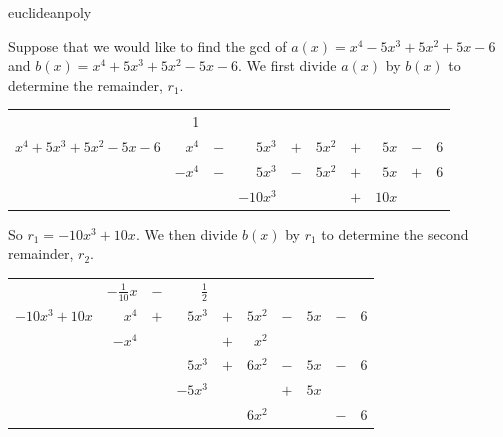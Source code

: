 \begin{example}{euclideanpoly} 

Suppose that we would like to find the gcd of $a(x) = x^4 - 5x^3 + 5x^2 +5x - 6$ and $b(x) = x^4 + 5x^3 + 5x^2 - 5x -6$.  We first divide $a(x)$ by $b(x)$ to determine the remainder, $r_1$.

\begin{center}
\begin{tabular}{rrcrcrcrcr}
        &  1         &        &                 &           &             &         &         &        &   \\ \cline{2-10}
 \multicolumn{1}{r|}{$x^4 + 5x^3 + 5x^2 - 5x -6$}
        &  $x^4$  &  $-$  &    $5x^3$   &  $+$   & $5x^2$  &  $+$  &  $5x$ & $-$  & 6 \\
        &  $-x^4$ &  $-$  &  $5x^3$     &   $-$   & $5x^2$  &  $+$  &  $5x$ & $+$ & 6 \\ \cline{2-10}
        &             &        &  $-10x^3$  &          &              &  $+$  & $10x$&       &    \\
 \end{tabular}
\end{center}

So $r_1 =-10x^3+10x$. We then divide $b(x)$ by $r_1$ to determine the second remainder, $r_2$.

\begin{center}
\begin{tabular}{rrcrcrcrcr}
        &  $-\frac{1}{10}x$        &    $-$    &     $\frac{1}{2}$            &           &             &         &         &        &   \\ \cline{2-10}
 \multicolumn{1}{r|}{$-10x^3+10x$}
        &  $x^4$  &  $+$  &    $5x^3$   &  $+$   & $5x^2$  &  $-$  &  $5x$ & $-$   & 6 \\
        &  $-x^4$ &          &                    &  $+$   & $x^2$    &         &           &         &  \\ \cline{2-10}
        &               &         &  $5x^3$      &  $+$   & $6x^2$  &  $-$  & $5x$  &  $-$  &  6  \\
        &              &          &  $-5x^3$    &            &                &  $+$ &  $5x$ &         &  \\ \cline{4-10}
        &              &          &                    &            & $6x^2$  &          &           & $-$  & 6\\
 \end{tabular}
\end{center}


\end{example}
